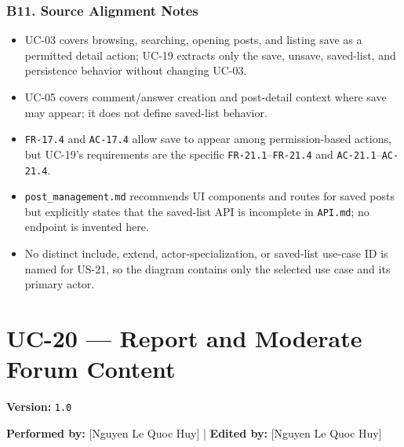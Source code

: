 \documentclass[12pt]{article}
\begin{document}
\hypertarget{sec:b11-source-alignment-notes}{}
\subsubsection*{B11. Source Alignment Notes}
\par\medskip

\begin{itemize}
\item UC-03 covers browsing, searching, opening posts, and listing save as a permitted detail action; UC-19 extracts only the save, unsave, saved-list, and persistence behavior without changing UC-03.
\item UC-05 covers comment/answer creation and post-detail context where save may appear; it does not define saved-list behavior.
\item \texttt{FR-17.4} and \texttt{AC-17.4} allow save to appear among permission-based actions, but UC-19's requirements are the specific \texttt{FR-21.1}--\texttt{FR-21.4} and \texttt{AC-21.1}--\texttt{AC-21.4}.
\item \texttt{post\_management.md} recommends UI components and routes for saved posts but explicitly states that the saved-list API is incomplete in \texttt{API.md}; no endpoint is invented here.
\item No distinct include, extend, actor-specialization, or saved-list use-case ID is named for US-21, so the diagram contains only the selected use case and its primary actor.
\end{itemize}
\par\medskip

\pagebreak
\hypertarget{sec:uc-20-report-and-moderate-forum-content}{}
\section*{UC-20 --- Report and Moderate Forum Content}
\par\medskip

\textbf{Version:} \texttt{1.0}
\par\medskip

\textbf{Performed by:} [Nguyen Le Quoc Huy] | \textbf{Edited by:} [Nguyen Le Quoc Huy]
\par\medskip
\end{document}
